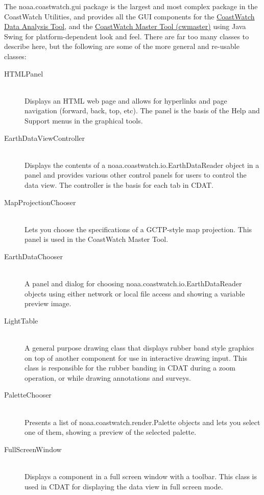 The {\java noaa.coastwatch.gui} package is the largest and most
complex package in the CoastWatch Utilities, and provides all the
GUI components for the \hyperlink{cdatchap}{CoastWatch Data
Analysis Tool}, and the \hyperlink{cwmaster}{CoastWatch Master Tool
(cwmaster)} using Java Swing for platform-dependent look and
feel.  There are far too many classes to describe here, but the
following are some of the more general and re-usable classes:
\begin{description}

\item[{\java HTMLPanel}]~\\ Displays an HTML web page and allows
for hyperlinks and page navigation (forward, back, top, etc).
The panel is the basis of the {\gui Help and Support} menus in
the graphical tools.

\item[{\java EarthDataViewController}]~\\ Displays the contents
of a {\java noaa.coastwatch.io.EarthDataReader} object in a panel
and provides various other control panels for users to control
the data view.  The controller is the basis for each tab in CDAT.

\item[{\java MapProjectionChooser}]~\\ Lets you choose the
specifications of a GCTP-style map projection.  This panel is
used in the CoastWatch Master Tool.

\item[{\java EarthDataChooser}]~\\ A panel and dialog for
choosing {\java noaa.coastwatch.io.EarthDataReader} objects using
either network or local file access and showing a variable
preview image.

\item[{\java LightTable}]~\\ A general purpose drawing class that
displays rubber band style graphics on top of another component
for use in interactive drawing input.  This class is responsible
for the rubber banding in CDAT during a zoom operation, or while
drawing annotations and surveys.

\item[{\java PaletteChooser}]~\\ Presents a list of {\java
noaa.coastwatch.render.Palette} objects and lets you select one
of them, showing a preview of the selected palette.

\item[{\java FullScreenWindow}]~\\ Displays a component in a full
screen window with a toolbar.  This class is used in CDAT for
displaying the data view in full screen mode.

\end{description}

